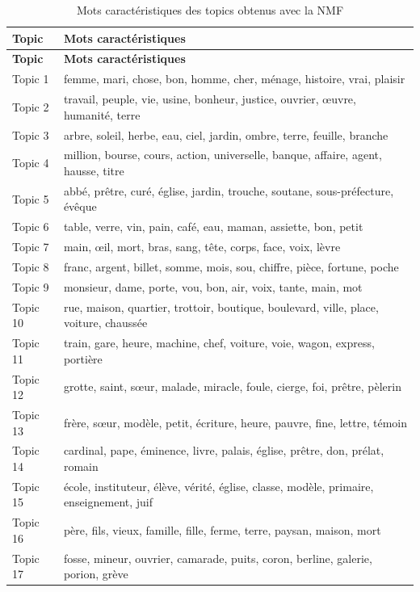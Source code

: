 \begin{longtable}{p{1.8cm}p{11.5cm}}
\caption{Mots caractéristiques des topics obtenus avec la NMF} \\
\toprule
\textbf{Topic} & \textbf{Mots caractéristiques} \\
\midrule
\endfirsthead

\toprule
\textbf{Topic} & \textbf{Mots caractéristiques} \\
\midrule
\endhead

Topic 1 & femme, mari, chose, bon, homme, cher, ménage, histoire, vrai, plaisir \\
Topic 2 & travail, peuple, vie, usine, bonheur, justice, ouvrier, œuvre, humanité, terre \\
Topic 3 & arbre, soleil, herbe, eau, ciel, jardin, ombre, terre, feuille, branche \\
Topic 4 & million, bourse, cours, action, universelle, banque, affaire, agent, hausse, titre \\
Topic 5 & abbé, prêtre, curé, église, jardin, trouche, soutane, sous-préfecture, évêque \\
Topic 6 & table, verre, vin, pain, café, eau, maman, assiette, bon, petit \\
Topic 7 & main, œil, mort, bras, sang, tête, corps, face, voix, lèvre \\
Topic 8 & franc, argent, billet, somme, mois, sou, chiffre, pièce, fortune, poche \\
Topic 9 & monsieur, dame, porte, vou, bon, air, voix, tante, main, mot \\
Topic 10 & rue, maison, quartier, trottoir, boutique, boulevard, ville, place, voiture, chaussée \\
Topic 11 & train, gare, heure, machine, chef, voiture, voie, wagon, express, portière \\
Topic 12 & grotte, saint, sœur, malade, miracle, foule, cierge, foi, prêtre, pèlerin \\
Topic 13 & frère, sœur, modèle, petit, écriture, heure, pauvre, fine, lettre, témoin \\
Topic 14 & cardinal, pape, éminence, livre, palais, église, prêtre, don, prélat, romain \\
Topic 15 & école, instituteur, élève, vérité, église, classe, modèle, primaire, enseignement, juif \\
Topic 16 & père, fils, vieux, famille, fille, ferme, terre, paysan, maison, mort \\
Topic 17 & fosse, mineur, ouvrier, camarade, puits, coron, berline, galerie, porion, grève \\

\end{longtable}
